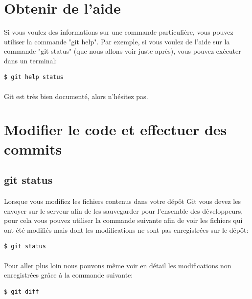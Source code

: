 \documentclass[french, a4paper, 12pt, titlepage]{article}
\begin{document}
\section{Obtenir de l'aide}

\paragraph{} Si vous voulez des informations sur une commande particulière,
vous pouvez utiliser la commande "git help". Par exemple, si vous voulez de
l'aide sur la commande "git status" (que nous allons voir juste après), vous
pouvez exécuter dans un terminal:

\begin{lstlisting}
$ git help status
\end{lstlisting}

\paragraph{} Git est très bien documenté, alors n'hésitez pas.

\section{Modifier le code et effectuer des commits}
\subsection{git status}
\paragraph{}Lorsque vous modifiez les fichiers contenus dans votre dépôt Git vous devez les envoyer sur le serveur afin de les sauvegarder pour l'ensemble des développeurs, pour cela vous pouvez utiliser la commande suivante afin de voir les fichiers qui ont été modifiés mais dont les modifications ne sont pas enregistrées sur le dépôt:
\begin{lstlisting}
$ git status
\end{lstlisting}

\paragraph{}Pour aller plus loin nous pouvons même voir en détail les modifications non enregistrées grâce à la commande suivante:
\begin{lstlisting}
$ git diff
\end{lstlisting}
\end{document}
